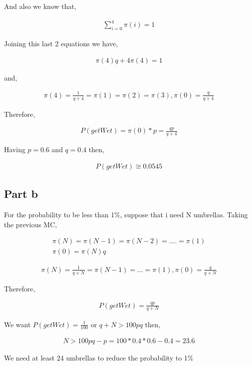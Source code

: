 \documentclass[12pt, a4paper]{article}
\begin{document}
And also we know that,

\begin{align*}
  \sum_{i=0}^4 \pi(i) = 1
\end{align*}

Joining this last 2 equations we have,

\begin{align*}
  \pi(4)q + 4\pi(4) = 1
\end{align*}

and,

\begin{align*}
  \pi(4) = \frac{1}{q + 4} = \pi(1) = \pi(2) = \pi(3), \pi(0) = \frac{q}{q + 4}
\end{align*}

Therefore,

\begin{align*}
  P(getWet) = \pi(0) * p = \frac{qp}{q + 4}
\end{align*}

Having $p=0.6$ and $q=0.4$ then,

\begin{align*}
  P(getWet) \cong 0.0545
\end{align*}


\subsection{Part b}
For the probability to be less than 1\%, suppose that i need N umbrellas. Taking
the previous MC,

\begin{align*}
  \pi(N) = \pi(N-1) = \pi(N-2) = .... = \pi(1)\\
  \pi(0) = \pi(N)q
\end{align*}

\begin{align*}
  \pi(N) = \frac{1}{q + N} = \pi(N - 1) = ... = \pi(1), \pi(0) = \frac{q}{q + N}
\end{align*}

Therefore,

\begin{align*}
  P(getWet) = \frac{qp}{q + N}
\end{align*}

We want $P(getWet) = \frac{1}{100}$ or $q + N > 100pq$ then,

\begin{align*}
  N > 100pq - p = 100 * 0.4 * 0.6 - 0.4 = 23.6
\end{align*}

We need at least 24 umbrellas to reduce the probability to 1\%
\end{document}
